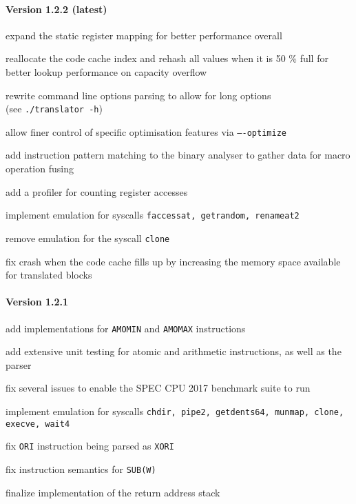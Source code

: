 \paragraph{Version 1.2.2 (latest)}
\begin{itemize*}
 	\item expand the static register mapping for better performance overall
 	\item reallocate the code cache index and rehash all values when it is 50 \% full for better lookup performance on capacity overflow
 	\item rewrite command line options parsing to allow for long options\\(see \texttt{./translator -h})
 	\item allow finer control of specific optimisation features via \texttt{----optimize}
 	\item add instruction pattern matching to the binary analyser to gather data for macro operation fusing
 	\item add a profiler for counting register accesses
 	\item implement emulation for syscalls \texttt{faccessat, getrandom, renameat2}
 	\item remove emulation for the syscall \texttt{clone}
 	\item fix crash when the code cache fills up by increasing the memory space available for translated blocks
\end{itemize*}


\paragraph{Version 1.2.1}
\begin{itemize*}
 	\item add implementations for \texttt{AMOMIN} and \texttt{AMOMAX} instructions
 	\item add extensive unit testing for atomic and arithmetic instructions, as well as the parser
 	\item fix several issues to enable the SPEC CPU 2017 benchmark suite to run
 	\item implement emulation for syscalls \texttt{chdir, pipe2, getdents64, munmap, clone, execve, wait4}
 	\item fix \texttt{ORI} instruction being parsed as \texttt{XORI}
 	\item fix instruction semantics for \texttt{SUB(W)}
 	\item finalize implementation of the return address stack
\end{itemize*}



